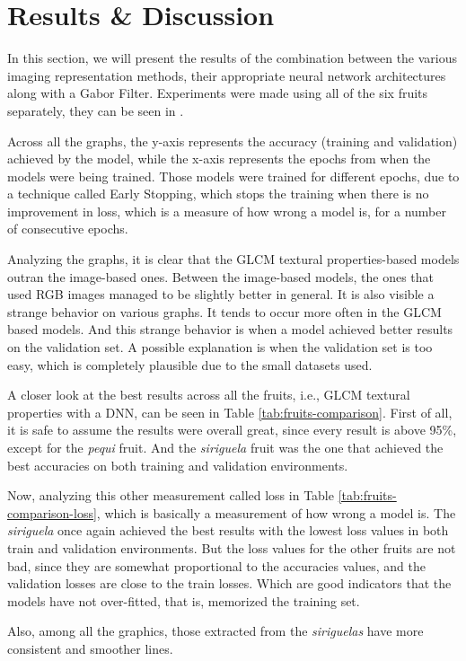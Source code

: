 \documentclass[../main.tex]{subfile}
\begin{document}
\section{Results \& Discussion} \label{sec:results-&-discussion}

In this section, we will present the results of the combination between the various imaging representation methods, their appropriate neural network architectures along with a Gabor Filter. Experiments were made using all of the six fruits separately, they can be seen in .








Across all the graphs, the y-axis represents the accuracy (training and validation) achieved by the model, while the x-axis represents the epochs from when the models were being trained. Those models were trained for different epochs, due to a technique called Early Stopping, which stops the training when there is no improvement in loss, which is a measure of how wrong a model is, for a number of consecutive epochs.

Analyzing the graphs, it is clear that the GLCM textural properties-based models outran the image-based ones. Between the image-based models, the ones that used RGB images managed to be slightly better in general. It is also visible a strange behavior on various graphs. It tends to occur more often in the GLCM based models. And this strange behavior is when a model achieved better results on the validation set. A possible explanation is when the validation set is too easy, which is completely plausible due to the small datasets used.



A closer look at the best results across all the fruits, i.e., GLCM textural properties with a DNN, can be seen in Table \ref{tab:fruits-comparison}. First of all, it is safe to assume the results were overall great, since every result is above 95\%, except for the \textit{pequi} fruit. And the \textit{siriguela} fruit was the one that achieved the best accuracies on both training and validation environments.



Now, analyzing this other measurement called loss in Table \ref{tab:fruits-comparison-loss}, which is basically a measurement of how wrong a model is. The \textit{siriguela} once again achieved the best results with the lowest loss values in both train and validation environments. But the loss values for the other fruits are not bad, since they are somewhat proportional to the accuracies values, and the validation losses are close to the train losses. Which are good indicators that the models have not over-fitted, that is, memorized the training set.

Also, among all the graphics, those extracted from the \textit{siriguelas} have more consistent and smoother lines.
\end{document}
